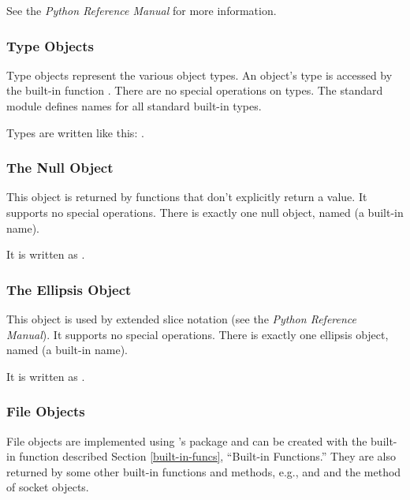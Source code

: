 See the \emph{Python Reference Manual} for more information.


\subsubsection{Type Objects \label{bltin-type-objects}}

Type objects represent the various object types.  An object's type is
accessed by the built-in function .  There are no special
operations on types.  The standard module  defines names
for all standard built-in types.

Types are written like this: .


\subsubsection{The Null Object \label{bltin-null-object}}

This object is returned by functions that don't explicitly return a
value.  It supports no special operations.  There is exactly one null
object, named  (a built-in name).

It is written as .


\subsubsection{The Ellipsis Object \label{bltin-ellipsis-object}}

This object is used by extended slice notation (see the \emph{Python
Reference Manual}).  It supports no special operations.  There is
exactly one ellipsis object, named  (a built-in name).

It is written as .

\subsubsection{File Objects \label{bltin-file-objects}}

File objects are implemented using \C{}'s  package and can be
created with the built-in function  described Section
\ref{built-in-funcs}, ``Built-in Functions.''  They are also returned
by some other built-in functions and methods, e.g.,
 and  and the
 method of socket objects.

